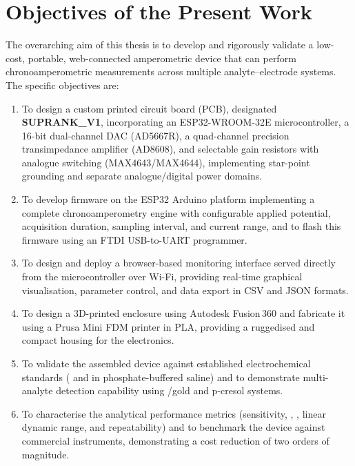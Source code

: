 \section{Objectives of the Present Work}
\label{sec:objectives}

The overarching aim of this thesis is to develop and rigorously validate a low-cost, portable, web-connected amperometric device that can perform chronoamperometric measurements across multiple analyte–electrode systems. The specific objectives are:

\begin{enumerate}[label=\roman*.]
    \item To design a custom printed circuit board (PCB), designated \textbf{SUPRANK\_V1}, incorporating an ESP32-WROOM-32E microcontroller, a 16-bit dual-channel DAC (AD5667R), a quad-channel precision transimpedance amplifier (AD8608), and selectable gain resistors with analogue switching (MAX4643/MAX4644), implementing star-point grounding and separate analogue/digital power domains.

    \item To develop firmware on the ESP32 Arduino platform implementing a complete chronoamperometry engine with configurable applied potential, acquisition duration, sampling interval, and current range, and to flash this firmware using an FTDI USB-to-UART programmer.

    \item To design and deploy a browser-based monitoring interface served directly from the microcontroller over Wi-Fi, providing real-time graphical visualisation, parameter control, and data export in CSV and JSON formats.

    \item To design a 3D-printed enclosure using Autodesk Fusion\,360 and fabricate it using a Prusa Mini FDM printer in PLA, providing a ruggedised and compact housing for the electronics.

    \item To validate the assembled device against established electrochemical standards (\ferrocene{} and \ruhex{} in phosphate-buffered saline) and to demonstrate multi-analyte detection capability using /gold and p-cresol systems.

    \item To characterise the analytical performance metrics (sensitivity, \LOD, \LOQ, linear dynamic range, and repeatability) and to benchmark the device against commercial instruments, demonstrating a cost reduction of two orders of magnitude.
\end{enumerate}

